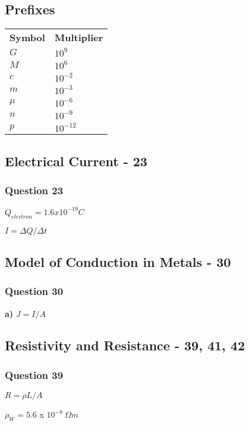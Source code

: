\documentclass[12pt, letterpaper, twoside]{article}
\begin{document}
    
  \subsection*{Prefixes}
    \begin{tabular}{l l}
  	  \textbf{Symbol} & \textbf{Multiplier}\\
      $G$ & $10^9$\\
      $M$ & $10^6$\\
      $c$ & $10^{-2}$\\
      $m$ & $10^{-3}$\\
      $\mu$ & $10^{-6}$\\
      $n$ & $10^{-9}$\\
      $p$ & $10^{-12}$\\
      
    
  \end{tabular}
    
  \subsection{Electrical Current - 23}
    \subsubsection*{Question 23}
      \begin{description}
        \item $Q_{electron} = 1.6x10^{-19}C$
        \item $I = \Delta Q / \Delta t$
      \end{description}
      
      
      
  \subsection{Model of Conduction in Metals - 30}
    \subsubsection*{Question 30}
      \begin{description}
        \item \textbf{a)} $J = I/A$
      \end{description}
  \subsection{Resistivity and Resistance - 39, 41, 42}
    \subsubsection*{Question 39}
      \begin{description}
        \item $R = \rho L/A$
        \item $\rho_{W} = 5.6$ x $10^{-8} \ \Omega m$
      \end{description}
\end{document}
